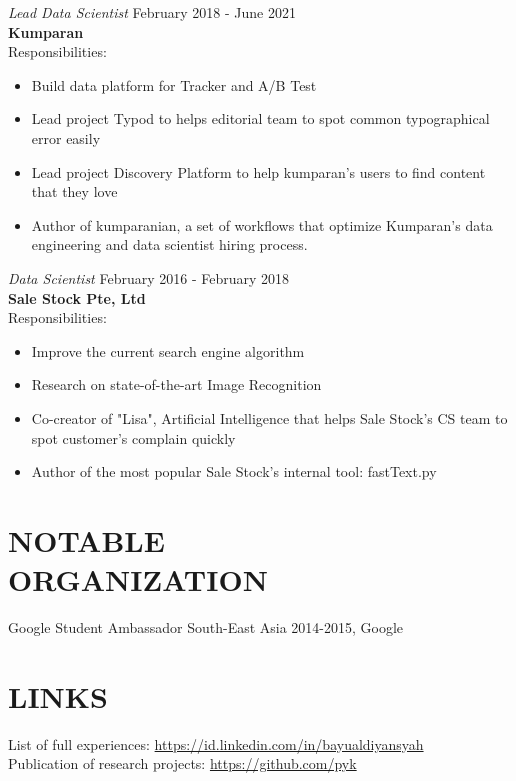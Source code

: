 \documentclass[margin, 10pt]{res} %
\begin{document}
\begin{resume}
{\sl Lead Data Scientist} \hfill February 2018 - June 2021 \\
\textbf{Kumparan} \\
Responsibilities:
\begin{itemize} \itemsep -2pt %
\item Build data platform for Tracker and A/B Test
\item Lead project Typod to helps editorial team to spot common typographical error easily
\item Lead project Discovery Platform to help kumparan's users to find content that they love
\item Author of kumparanian, a set of workflows that optimize Kumparan's
data engineering and data scientist hiring process.
\end{itemize}

{\sl Data Scientist} \hfill February 2016 - February 2018 \\
\textbf{Sale Stock Pte, Ltd} \\
Responsibilities:
\begin{itemize} \itemsep -2pt %
\item Improve the current search engine algorithm
\item Research on state-of-the-art Image Recognition
\item Co-creator of "Lisa", Artificial Intelligence that helps Sale Stock's CS team to spot customer's complain quickly
\item Author of the most popular Sale Stock's internal tool: fastText.py
\end{itemize}


\section{NOTABLE\\ORGANIZATION}

Google Student Ambassador South-East Asia 2014-2015, Google\\



\section{LINKS}
List of full experiences: \url{https://id.linkedin.com/in/bayualdiyansyah}\\
Publication of research projects: \url{https://github.com/pyk}\\


\end{resume}
\end{document}
